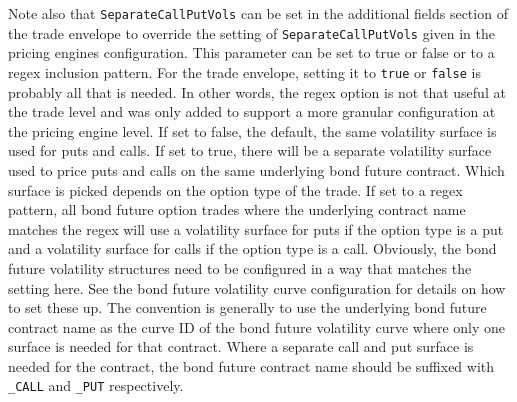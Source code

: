 Note also that \lstinline!SeparateCallPutVols! can be set in the additional fields section of the trade envelope to 
override the setting of \lstinline!SeparateCallPutVols! given in the pricing engines configuration.
This parameter can be set to true or false or to a regex inclusion pattern.
For the trade envelope, setting it to \lstinline!true! or \lstinline!false! is probably all that is needed. In other 
words, the regex option is not that useful at the trade level and was only added to support a more granular configuration 
at the pricing engine level.
If set to false, the default, the same volatility surface is used for puts and calls.
If set to true, there will be a separate volatility surface used to price puts and calls on the same underlying 
bond future contract. Which surface is picked depends on the option type of the trade.
If set to a regex pattern, all bond future option trades where the underlying contract name matches the regex 
will use a volatility surface for puts if the option type is a put and a volatility surface for calls if the 
option type is a call.
Obviously, the bond future volatility structures need to be configured in a way that matches the setting here.
See the bond future volatility curve configuration for details on how to set these up. The convention is 
generally to use the underlying bond future contract name as the curve ID of the bond future volatility 
curve where only one surface is needed for that contract.
Where a separate call and put surface is needed for the contract, the bond future contract name should be 
suffixed with \lstinline!_CALL! and \lstinline!_PUT! respectively.
